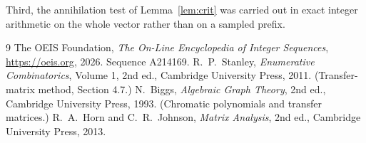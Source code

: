 \documentclass[11pt,a4paper]{article}
\theoremstyle{plain}
\theoremstyle{definition}
\begin{document}
Third, the annihilation test of Lemma~\ref{lem:crit} was carried out in exact integer
arithmetic on the whole vector rather than on a sampled prefix.

\begin{thebibliography}{9}
 The OEIS Foundation, \emph{The On-Line Encyclopedia of Integer
Sequences}, \url{https://oeis.org}, 2026. Sequence A214169.
 R.~P.~Stanley, \emph{Enumerative Combinatorics}, Volume 1, 2nd ed.,
Cambridge University Press, 2011. (Transfer-matrix method, Section 4.7.)
 N.~Biggs, \emph{Algebraic Graph Theory}, 2nd ed., Cambridge University
Press, 1993. (Chromatic polynomials and transfer matrices.)
 R.~A.~Horn and C.~R.~Johnson, \emph{Matrix Analysis}, 2nd ed., Cambridge
University Press, 2013.
\end{thebibliography}
\end{document}
